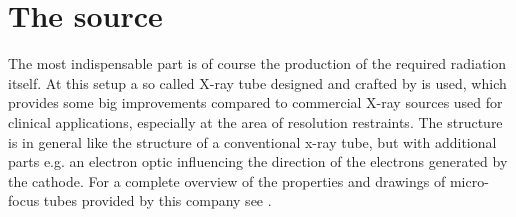 \section{The source} \label{sec:source}
The most indispensable part is of course the production of the required radiation itself. At this setup a so called  X-ray tube designed and crafted by  is used, which provides some big improvements compared to commercial X-ray sources used for clinical applications, especially at the area of resolution restraints. The structure is in general like the structure of a conventional x-ray tube, but with additional parts e.g. an electron optic influencing the direction of the electrons generated by the cathode. For a complete overview of the properties and drawings of micro-focus tubes provided by this company see \citep{DatasheetX,Datashort,CAD,X-COMsoft}.   
